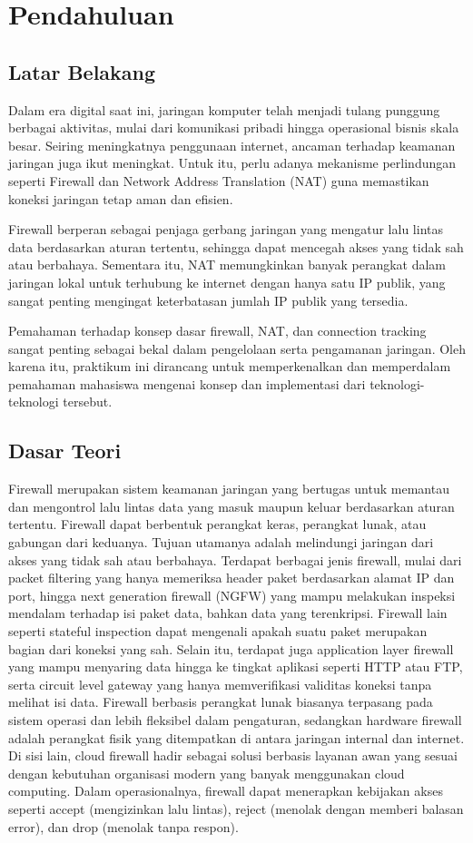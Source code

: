 \section{Pendahuluan}
\subsection{Latar Belakang}
Dalam era digital saat ini, jaringan komputer telah menjadi tulang punggung berbagai aktivitas, mulai dari komunikasi pribadi hingga operasional bisnis skala besar. Seiring meningkatnya penggunaan internet, ancaman terhadap keamanan jaringan juga ikut meningkat. Untuk itu, perlu adanya mekanisme perlindungan seperti Firewall dan Network Address Translation (NAT) guna memastikan koneksi jaringan tetap aman dan efisien.

Firewall berperan sebagai penjaga gerbang jaringan yang mengatur lalu lintas data berdasarkan aturan tertentu, sehingga dapat mencegah akses yang tidak sah atau berbahaya. Sementara itu, NAT memungkinkan banyak perangkat dalam jaringan lokal untuk terhubung ke internet dengan hanya satu IP publik, yang sangat penting mengingat keterbatasan jumlah IP publik yang tersedia.

Pemahaman terhadap konsep dasar firewall, NAT, dan connection tracking sangat penting sebagai bekal dalam pengelolaan serta pengamanan jaringan. Oleh karena itu, praktikum ini dirancang untuk memperkenalkan dan memperdalam pemahaman mahasiswa mengenai konsep dan implementasi dari teknologi-teknologi tersebut.

\subsection{Dasar Teori}

Firewall merupakan sistem keamanan jaringan yang bertugas untuk memantau dan mengontrol lalu lintas data yang masuk maupun keluar berdasarkan aturan tertentu. Firewall dapat berbentuk perangkat keras, perangkat lunak, atau gabungan dari keduanya. Tujuan utamanya adalah melindungi jaringan dari akses yang tidak sah atau berbahaya. Terdapat berbagai jenis firewall, mulai dari packet filtering yang hanya memeriksa header paket berdasarkan alamat IP dan port, hingga next generation firewall (NGFW) yang mampu melakukan inspeksi mendalam terhadap isi paket data, bahkan data yang terenkripsi. Firewall lain seperti stateful inspection dapat mengenali apakah suatu paket merupakan bagian dari koneksi yang sah. Selain itu, terdapat juga application layer firewall yang mampu menyaring data hingga ke tingkat aplikasi seperti HTTP atau FTP, serta circuit level gateway yang hanya memverifikasi validitas koneksi tanpa melihat isi data. Firewall berbasis perangkat lunak biasanya terpasang pada sistem operasi dan lebih fleksibel dalam pengaturan, sedangkan hardware firewall adalah perangkat fisik yang ditempatkan di antara jaringan internal dan internet. Di sisi lain, cloud firewall hadir sebagai solusi berbasis layanan awan yang sesuai dengan kebutuhan organisasi modern yang banyak menggunakan cloud computing. Dalam operasionalnya, firewall dapat menerapkan kebijakan akses seperti accept (mengizinkan lalu lintas), reject (menolak dengan memberi balasan error), dan drop (menolak tanpa respon).


